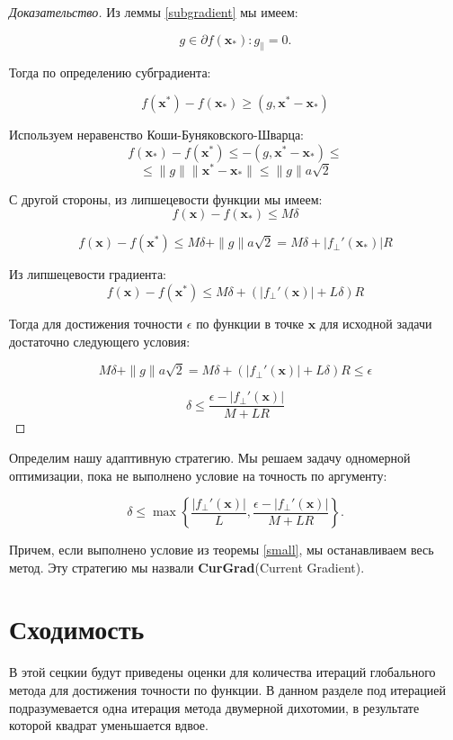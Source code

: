 \documentclass[12pt]{article}
\begin{document}
\begin{proof}[Доказательство]

Из леммы \ref{subgradient} мы имеем:

$$g \in \partial f(\textbf{x}_*): g_\parallel = 0.$$

Тогда по определению субградиента:

$$f(\textbf{x}^*) - f(\textbf{x}_*) \geq (g, \textbf{x}^* - \textbf{x}_*)$$

Используем неравенство Коши-Буняковского-Шварца:
$$f(\textbf{x}_*) - f(\textbf{x}^*) \leq -(g, \textbf{x}^* - \textbf{x}_* )\leq$$
$$\leq \|g\| \|\textbf{x}^* - \textbf{x}_*\|\leq \|g\|a\sqrt{2}$$

С другой стороны, из липшецевости функции мы имеем:
$$f(\textbf{x})-f(\textbf{x}_*)\leq M\delta$$

$$f(\textbf{x})-f(\textbf{x}^*) \leq M\delta +\|g\|a\sqrt{2} = M\delta + |f_\perp'(\textbf{x}_*)|R$$

Из липшецевости градиента:
$$f(\textbf{x})-f(\textbf{x}^*) \leq M\delta + \left(|f_\perp'(\textbf{x})|+L\delta\right)R$$

Тогда для достижения точности $\epsilon$ по функции в точке $\textbf{x}$ для исходной задачи достаточно следующего условия:

$$M\delta +\|g\|a\sqrt{2} = M\delta + \left(|f_\perp'(\textbf{x})|+L\delta\right)R \leq \epsilon$$

$$\delta \leq \frac{\epsilon - |f_\perp'(\textbf{x})|}{M+LR}$$
\end{proof}


Определим нашу адаптивную стратегию. Мы решаем задачу одномерной оптимизации, пока не выполнено условие на точность по аргументу:

\begin{equation}
\label{Adaptive}
\delta \leq \max\left\{
	\frac{|f_\perp'(\textbf{x})|}{L}, 
	\frac{\epsilon - |f_\perp'(\textbf{x})|}{M+LR}
	\right\}.
\end{equation}

Причем, если выполнено условие из теоремы \ref{small}, мы останавливаем весь метод. Эту стратегию мы назвали \textbf{CurGrad}(Current Gradient).


\section{Сходимость}

В этой сецкии будут приведены оценки для количества итераций глобального метода для достижения точности по функции. В данном разделе под итерацией подразумевается одна итерация метода двумерной дихотомии, в результате которой квадрат уменьшается вдвое.
\end{document}
